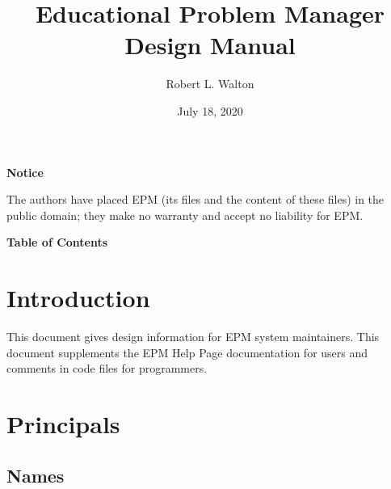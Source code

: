 \documentclass[12pt]{article}
\makeatletter
\renewcommand\tableofcontents{%
    \begin{list}{}%
	     {\setlength{\itemsep}{0in}%
	      \setlength{\topsep}{0in}%
	      \setlength{\parsep}{1ex}%
	      \setlength{\labelwidth}{0in}%
	      \setlength{\baselineskip}{1.5ex}%
	      \setlength{\leftmargin}{0.8in}%
	      \setlength{\rightmargin}{0.8in}}%
    \item\@starttoc{toc}%
    \end{list}}
\makeatother
\begin{document}
        
\title{Educational Problem Manager\\
Design Manual}

\author{Robert L. Walton}

\date{July 18, 2020}
 
\maketitle

\begin{center}
{\large \bf Notice}
\\[2ex]
\begin{minipage}{5.5in}
The authors have placed EPM (its files and the content of these files) in
the public domain; they make no warranty and accept
no liability for EPM.
\end{minipage}
\end{center}
\begin{center}
\large \bf Table of Contents
\end{center}

\bigskip

\tableofcontents 

\newpage

\section{Introduction}

This document gives design information for EPM system maintainers.
This document supplements the EPM Help Page documentation for
users and comments in code files for programmers.

\section{Principals}

\subsection{Names}
\end{document}
